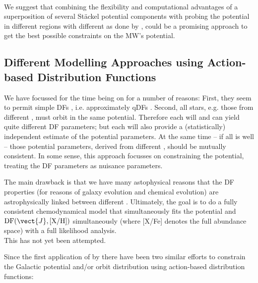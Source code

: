 \\We suggest that combining the flexibility and computational advantages of a superposition of several St\"{a}ckel potential components with probing the potential in different regions with different \MAPs{} as done by \citet{bov13}, could be a promising approach to get the best possible constraints on the MW's potential.

\subsection{Different Modelling Approaches using Action-based Distribution Functions}

We have focussed for the time being on \MAPs{} for a number of reasons: First, they seem to permit simple DFs \citep{bov12b,bov12c,2012ApJ...753..148B}, i.e. approximately qDFs \citep{tin13}. Second, all stars, e.g. those from different \MAPs{}, must orbit in the same potential. Therefore each \MAP{} will and can yield quite different DF parameters; but each \MAP{} will also provide a (statistically) independent estimate of the potential parameters. At the same time -- if all is well -- those potential parameters, derived from different \MAPs{}, should be mutually consistent. In some sense, this approach focusses on constraining the potential, treating the DF parameters as nuisance parameters.

The main drawback is that we have many astophysical reasons that the DF properties (for reasons of galaxy evolution and chemical evolution) are astrophysically linked between different \MAPs{}. Ultimately, the goal is to do a fully consistent chemodynamical model that simultaneously fits the potential and $\text{DF}(\vect{J},\text{[X/H]})$ simultaneously (where [X/Fe] denotes the full abundance space) with a full likelihood analysis. 
\\This has not yet been attempted. 

Since the first application of \RM{} by \citet{bov13} there have been two similar efforts to constrain the Galactic potential and/or orbit distribution using action-based distribution functions:

